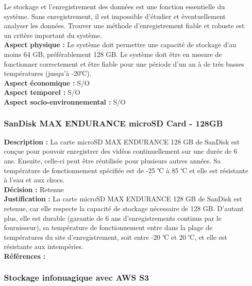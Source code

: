 Le stockage et l’enregistrement des données est une fonction essentielle du
système. Sans enregistrement, il est impossible d’étudier et éventuellement
analyser les données. Trouver une méthode d’enregistrement fiable et robuste
est un critère important du système. \\

\noindent
\textbf{Aspect physique :} Le système doit
permettre une capacité de stockage d'au moins 64 GB, préférablement 128 GB. Le
système doit être en mesure de fonctionner correctement et être fiable pour une
période d'un an à de très basses températures (jusqu'à -20℃). \\
\textbf{Aspect économique :} S/O \\
\textbf{Aspect temporel :} S/O \\
\textbf{Aspect socio-environnemental :} S/O

\subsubsection{SanDisk MAX ENDURANCE microSD Card - 128GB}

\noindent
\textbf{Description :} La carte microSD MAX ENDURANCE 128 GB de SanDisk est conçue pour
pouvoir enregistrer des vidéos continuellement sur une durée de 6 ans. Ensuite,
celle-ci peut être réutilisée pour plusieurs autres années. Sa température de
fonctionnement spécifiée est de -25 ℃ à 85 ℃ et elle est résistante à l'eau et
aux chocs. \\

\noindent
\textbf{Décision :} Retenue \\

\noindent
\textbf{Justification :} La carte microSD MAX ENDURANCE 128
GB de SanDisk est retenue, car elle respecte la capacité de stockage nécessaire
de 128 GB. D’autant plus, elle est durable (garantie de 6 ans d'enregistrements
continus par le fournisseur), sa température de fonctionnement entre dans la
plage de températures du site d'enregistrement, soit entre -20 ℃ et 20 ℃, et
elle est résistante aux intempéries. \\

\noindent
\textbf{Références :} \cite{22} \cite{23} \\

\subsubsection{Stockage infonuagique avec AWS S3}


